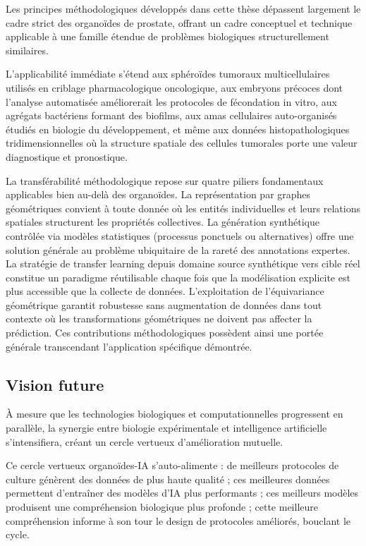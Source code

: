 Les principes méthodologiques développés dans cette thèse dépassent largement le cadre strict des organoïdes de prostate, offrant un cadre conceptuel et technique applicable à une famille étendue de problèmes biologiques structurellement similaires.

L'applicabilité immédiate s'étend aux sphéroïdes tumoraux multicellulaires~\cite{Boj2015} utilisés en criblage pharmacologique oncologique, aux embryons précoces dont l'analyse automatisée améliorerait les protocoles de fécondation in vitro, aux agrégats bactériens formant des biofilms, aux amas cellulaires auto-organisés étudiés en biologie du développement, et même aux données histopathologiques tridimensionnelles où la structure spatiale des cellules tumorales porte une valeur diagnostique et pronostique.

La transférabilité méthodologique repose sur quatre piliers fondamentaux applicables bien au-delà des organoïdes. La représentation par graphes géométriques convient à toute donnée où les entités individuelles et leurs relations spatiales structurent les propriétés collectives. La génération synthétique contrôlée via modèles statistiques (processus ponctuels ou alternatives) offre une solution générale au problème ubiquitaire de la rareté des annotations expertes. La stratégie de transfer learning depuis domaine source synthétique vers cible réel constitue un paradigme réutilisable chaque fois que la modélisation explicite est plus accessible que la collecte de données. L'exploitation de l'équivariance géométrique garantit robustesse sans augmentation de données dans tout contexte où les transformations géométriques ne doivent pas affecter la prédiction. Ces contributions méthodologiques possèdent ainsi une portée générale transcendant l'application spécifique démontrée.

\subsection{Vision future}

À mesure que les technologies biologiques et computationnelles progressent en parallèle, la synergie entre biologie expérimentale et intelligence artificielle s'intensifiera, créant un cercle vertueux d'amélioration mutuelle.

Ce cercle vertueux organoïdes-IA s'auto-alimente : de meilleurs protocoles de culture génèrent des données de plus haute qualité ; ces meilleures données permettent d'entraîner des modèles d'IA plus performants ; ces meilleurs modèles produisent une compréhension biologique plus profonde ; cette meilleure compréhension informe à son tour le design de protocoles améliorés, bouclant le cycle.

